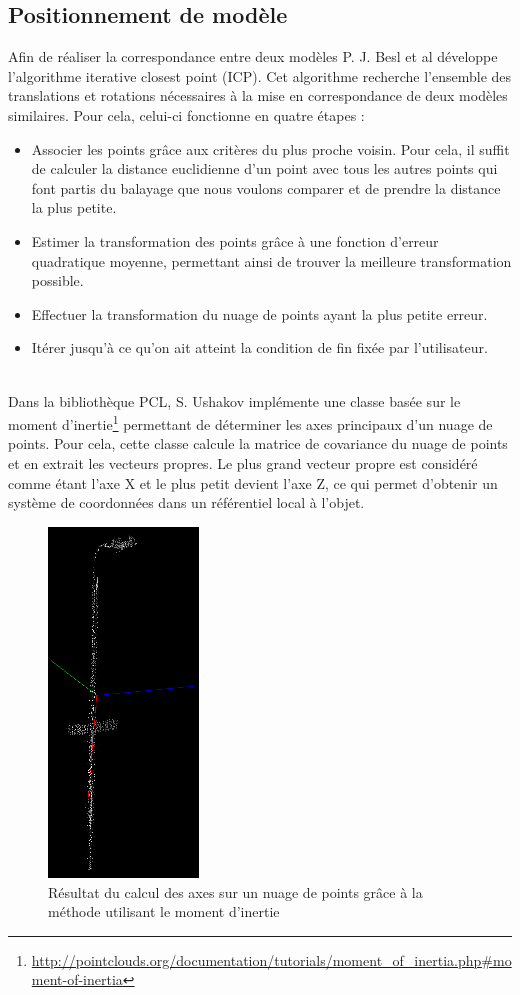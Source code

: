 \subsection{Positionnement de modèle}
Afin de réaliser la correspondance entre deux modèles P. J. Besl et al\cite{ICP} développe l'algorithme \og iterative closest point \fg (ICP).
Cet algorithme recherche l'ensemble des translations et rotations nécessaires à la mise en correspondance de deux modèles similaires. Pour cela,
celui-ci fonctionne en quatre étapes :
\begin{itemize}
  \item Associer les points grâce aux critères du plus proche voisin. Pour cela, il suffit de calculer la distance euclidienne d'un
   point avec tous les autres points qui font partis du balayage que nous voulons comparer et de prendre la distance la plus petite.
  \item Estimer la transformation des points grâce à une fonction d'erreur quadratique moyenne, permettant ainsi de trouver la meilleure
  transformation possible.
  \item Effectuer la transformation du nuage de points ayant la plus petite erreur.
  \item Itérer jusqu'à ce qu'on ait atteint la condition de fin fixée par l'utilisateur.
\end{itemize}
\ \\
Dans la bibliothèque PCL\cite{PCL}, S. Ushakov implémente une classe basée sur le moment d'inertie\footnote{\url{http://pointclouds.org/documentation/tutorials/moment\_of\_inertia.php\#moment-of-inertia}}
permettant de déterminer les axes principaux d'un nuage de points. Pour cela, cette classe calcule la matrice de covariance du nuage de points et 
en extrait les vecteurs propres. Le plus grand vecteur propre est considéré comme étant l'axe X et le plus petit devient l'axe Z, ce qui permet 
d'obtenir un système de coordonnées dans un référentiel local à l'objet.\\   
\begin{figure}[!ht]
  \begin{center}
    \includegraphics[width=4cm]{image/objectAxis.png}
    \caption{Résultat du calcul des axes sur un nuage de points grâce à la méthode utilisant le moment d'inertie}
  \end{center}
\end{figure}

